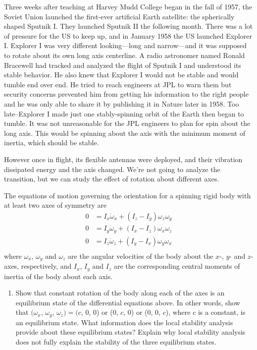 \documentclass[12pt,letterpaper]{hmcpset}
\begin{document}
	\begin{solution}
		\vfill
	\end{solution}
	
	\newpage
	
	\begin{problem}[3]
		Three weeks after teaching at Harvey Mudd College
		began in the fall of 1957, the Soviet Union launched
		the first-ever artificial Earth satellite: the spherically shaped
		Sputnik I. They launched Sputnik II the
		following month. There was a lot of pressure for
		the US to keep up, and in January 1958 the US
		launched Explorer I. Explorer I was very different
		looking---long and narrow---and it was supposed to
		rotate about its own long axis centerline.
		A radio astronomer named Ronald Bracewell had tracked and analyzed the flight of Sputnik I
		and understood its stable behavior. He also knew that Explorer I would not be stable and
		would tumble end over end. He tried to reach engineers at JPL to warn them but security
		concerns prevented him from getting his information to the right people and he was only
		able to share it by publishing it in Nature later in 1958. Too late--Explorer I made just one
		stably-spinning orbit of the Earth then began to tumble.
		It was not unreasonable for the JPL engineers to plan for spin about the long axis. This would
		be spinning about the axis with the minimum moment of inertia, which should be stable.
		
		However once in flight, its flexible antennas were deployed, and their vibration dissipated
		energy and the axis changed. We're not going to analyze the transition, but we can study the
		effect of rotation about different axes.
		
		The equations of motion governing the orientation for a spinning rigid body with at least
		two axes of symmetry are
		\begin{displaymath}
			\begin{split}
				0 &= I_x \dot{\omega}_x + (I_z - I_y)\omega_z\omega_y\\
				0 &= I_y \dot{\omega}_y + (I_x - I_z)\omega_x\omega_z\\
				0 &= I_z \dot{\omega}_z + (I_y - I_x)\omega_y\omega_x\\
			\end{split}
		\end{displaymath}
		where $\omega_x$, $\omega_y$ and $\omega_z$ are the angular velocities of the body about the $x$-, $y$- and $z$-axes,
		respectively, and $I_x$, $I_y$ and $I_z$ are the corresponding central moments of inertia of the body
		about each axis.
		\begin{enumerate}
			\item Show that constant rotation of the body along each of the axes is an equilibrium state of
			the differential equations above. In other words, show that $(\omega_x$, $\omega_y$, $\omega_z)=(c$, 0, 0) or (0, $c$, 0) or (0, 0, $c$), where $c$ is a constant, is an equilibrium state. What information does
			the local stability analysis provide about these equilibrium states? Explain why local
			stability analysis does not fully explain the stability of the three equilibrium states.
			

\end{enumerate}
\end{problem}
\end{document}
